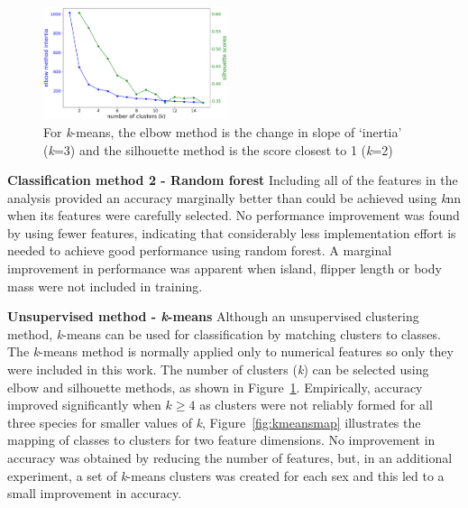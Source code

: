 \documentclass[12pt]{article}
\begin{document}
\begin{figure} %
  \centering
  \vspace{-2\baselineskip} %
  \includegraphics[width=0.48\textwidth]{kmeansvalue.png} %
  \vspace{-1.5\baselineskip} %
  \caption{For \textit{k}-means, the elbow method is the change in slope of `inertia' (\textit{k}=3)
  and the silhouette method is the score closest to 1 (\textit{k}=2)}
  \vspace{-0.5\baselineskip} %
  \label{fig:kmeansvalue}
\end{figure}

\textbf{Classification method 2 - Random forest}  
Including all of the features in the analysis provided an accuracy marginally better 
than could be achieved using \textit{k}nn when its features were carefully selected. 
No performance improvement was found by using fewer features, indicating that 
considerably less implementation effort is needed to achieve good performance using random forest. 
A marginal improvement in performance was apparent when island, flipper length or body mass were not included in training.

\textbf{Unsupervised method - \textit{k}-means}  
Although an unsupervised clustering method, 
\textit{k}-means can be used for classification by matching clusters to classes. 
The \textit{k}-means method is normally applied only to numerical features so only they were included in this work. 
The number of clusters (\textit{k}) can be selected using elbow and silhouette methods, 
as shown in Figure~\ref{fig:kmeansvalue}. Empirically, accuracy improved significantly when \(k \geq 4\)
as clusters were not reliably formed for all three species for smaller values of \textit{k},  
Figure~\ref{fig:kmeansmap} illustrates the mapping of classes to clusters for two feature dimensions. 
No improvement in accuracy was obtained by reducing the number of features, 
but, in an additional experiment, a set of \textit{k}-means clusters was created for each sex 
and this led to a small improvement in accuracy. 
\end{document}
